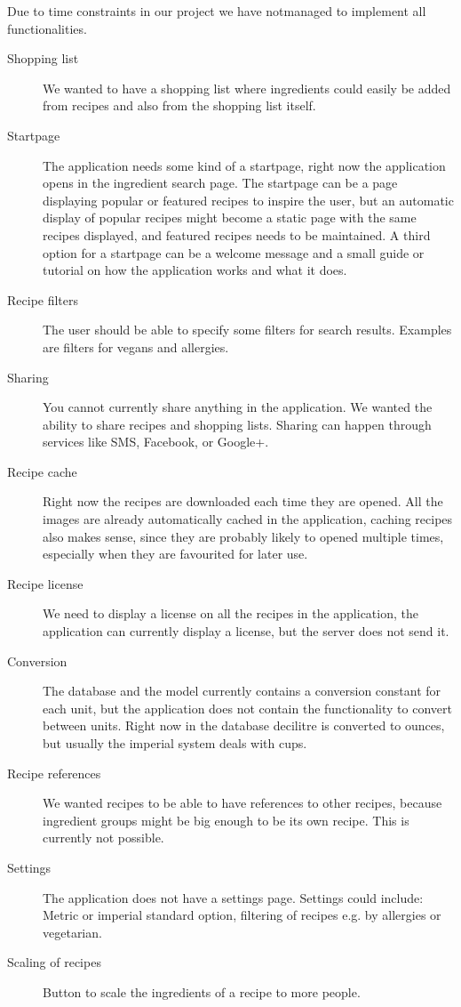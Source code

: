 Due to time constraints in our project we have notmanaged to implement all functionalities.

\begin{description}
\item[Shopping list] We wanted to have a shopping list where ingredients could easily be added from recipes and also from the shopping list itself.

\item[Startpage] The application needs some kind of a startpage, right now the application opens in the ingredient search page. The startpage can be a page displaying popular or featured recipes to inspire the user, but an automatic display of popular recipes might become a static page with the same recipes displayed, and featured recipes needs to be maintained. A third option for a startpage can be a welcome message and a small guide or tutorial on how the application works and what it does.

\item[Recipe filters] The user should be able to specify some filters for search results. Examples are filters for vegans and allergies.

\item[Sharing] You cannot currently share anything in the application. We wanted the ability to share recipes and shopping lists. Sharing can happen through services like SMS, Facebook, or Google+.

\item[Recipe cache] Right now the recipes are downloaded each time they are opened. All the images are already automatically cached in the application, caching recipes also makes sense, since they are probably likely to opened multiple times, especially when they are favourited for later use.

\item[Recipe license] We need to display a license on all the recipes in the application, the application can currently display a license, but the server does not send it.

\item[Conversion] The database and the model currently contains a conversion constant for each unit, but the application does not contain the functionality to convert between units. Right now in the database decilitre is converted to ounces, but usually the imperial system deals with cups.

\item[Recipe references] We wanted recipes to be able to have references to other recipes, because ingredient groups might be big enough to be its own recipe. This is currently not possible.

\item[Settings] The application does not have a settings page. Settings could include: Metric or imperial standard option, filtering of recipes e.g. by allergies or vegetarian.

\item[Scaling of recipes] Button to scale the ingredients of a recipe to more people.
\end{description}

